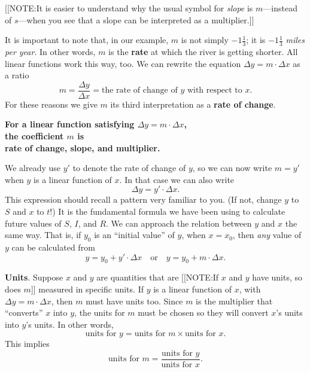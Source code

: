 [[NOTE:It is easier to understand why the usual symbol for {\em
    slope\/} is $m$---instead of $s$---when you see that a slope can
  be interpreted as a multiplier.]]

It is important to note that, in our example, $m$ is not simply
$-1\tfrac{1}{3}$; it is $-1\tfrac{1}{3}$ {\em miles per year}.  In
other words, $m$ is the {\bf rate} at which the river is getting
shorter.  All linear functions work this way, too.  We can rewrite the
equation $\Delta y = m\cdot\Delta x$ as a ratio
\[
m = \dfrac{\Delta y}{\Delta x} = 
		\mbox{the rate of change of $y$ with respect 
			to $x$}.
\]
For these reasons we give $m$ its third interpretation as a {\bf rate
  of change}.

\begin{observation}
\bf For a linear function satisfying
		\boldmath $\Delta y = m\cdot\Delta x$, \\
\bf the coefficient \boldmath $m$ is \\
\bf rate of change, slope, and multiplier.
\end{observation}

We already use $y'$ to denote the rate of change of $y$, so we can now
write $m = y'$ when $y$ is a linear function of $x$.  In that case we
can also write
\[
\Delta y = y' \cdot \Delta x.
\]
This expression should recall a pattern very familiar to you.  (If
not, change $y$ to $S$ and $x$ to $t$!)  It is the fundamental formula
we have been using to calculate future values of $S$, $I$, and $R$.
We can approach the relation between $y$ and $x$ the same way.  That
is, if $y_0$ is an ``initial value'' of $y$, when $x = x_0$, then {\em
  any\/} value of $y$ can be calculated from
\[
y = y_0 + y' \cdot \Delta x \quad \mbox{or} \quad
		y = y_0 + m \cdot \Delta x.
\]
\label{multiplier-end}





{\bf Units}.  Suppose $x$ and $y$ are quantities that are 
[[NOTE:If $x$ and $y$ have units, so does $m$]]
measured in specific units.  If $y$ is a linear function of $x$, with
$\Delta y = m\cdot\Delta x$, then $m$ must have units too.  Since $m$
is the multiplier that ``converts'' $x$ into $y$, the units for $m$
must be chosen so they will convert $x$'s units into $y$'s units.  In
other words,
\[
\mbox{units for $y$} = \mbox{units for $m$} \times 
		\mbox{units for $x$}.
\]
This implies
\[
\mbox{units for $m$} 
    = \dfrac{\mbox{units for $y$}}{\mbox{units for $x$}}.
\]


